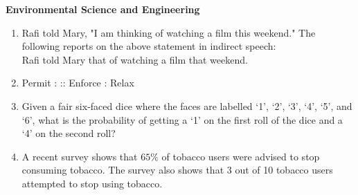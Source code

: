 \documentclass[journal,12pt,onecolumn]{IEEEtran}
\theoremstyle{remark}
\begin{document}
\centering
\textbf{Environmental Science and Engineering}
\begin{enumerate}
\item Rafi told Mary, "I am thinking of watching a film this weekend." 
The following reports on the above statement in indirect speech:\\ Rafi told Mary that 
\underline{\hspace{2cm}} of watching a film that weekend.
\begin{enumerate}
\end{enumerate}
\hfill{}
\item Permit : \underline{\hspace{2cm}} :: Enforce : Relax \\
\begin{enumerate}
\end{enumerate}
\hfill{}
\item Given a fair six-faced dice where the faces are labelled `1', `2', `3', `4', `5', and `6', what is the probability of getting a `1' on the first roll of the dice and a `4' on the second roll?
\begin{enumerate}
\end{enumerate}
\hfill{}
\item A recent survey shows that $65\%$ of tobacco users were advised to stop consuming tobacco. 
The survey also shows that 3 out of 10 tobacco users attempted to stop using tobacco. \\

\end{enumerate}
\end{document}
